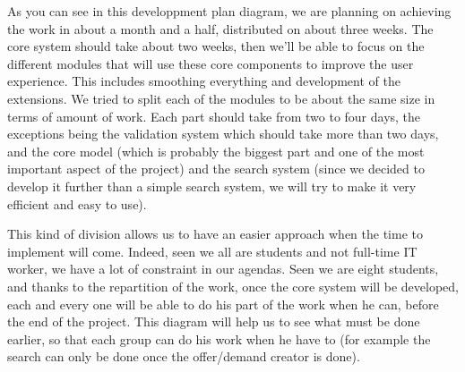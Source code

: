 As you can see in this developpment plan diagram, we are planning on achieving the work in about a month and a half, distributed on about three weeks.
The core system should take about two weeks, then we'll be able to focus on the different modules that will use these core components to improve the user experience.
This includes smoothing everything and development of the extensions.
We tried to split each of the modules to be about the same size in terms of amount of work.
Each part should take from two to four days, the exceptions being the validation system which should take more than two days, and the core model (which is probably the biggest part and one of the most important aspect of the project) and the search system (since we decided to develop it further than a simple search system, we will try to make it very efficient and easy to use).

This kind of division allows us to have an easier approach when the time to implement will come.
Indeed, seen we all are students and not full-time IT worker, we have a lot of constraint in our agendas. 
Seen we are eight students, and thanks to the repartition of the work, once the core system will be developed, each and every one will be able to do his part of the work when he can, before the end of the project.
This diagram will help us to see what must be done earlier, so that each group can do his work when he have to (for example the search can only be done once the offer/demand creator is done).

